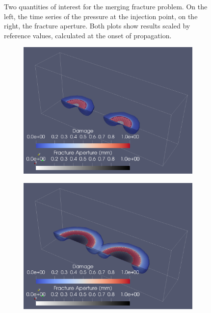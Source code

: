 \begin{figure}[h]
\noindent
\hspace{0.5cm}

\caption{Two quantities of interest for the merging fracture problem. On the left, the time series of the pressure at the injection point, on the right, the fracture aperture. Both plots show results scaled by reference values, calculated at the onset of propagation.}  
\label{fig:merging_charts}
\end{figure}


\begin{figure}[h]
\begin{subfigure}{.45\textwidth}
  \centering
  \includegraphics[width=\linewidth]{Chapter4/figures/merging/merging_t_1.png}
  \caption{}
  \label{fig:merge_t_0}
\end{subfigure}%
\hspace{1cm}
\begin{subfigure}{.45\textwidth}
  \centering
  \includegraphics[width=\linewidth]{Chapter4/figures/merging/merging_t_14.png}
  \caption{}
  \label{fig:merge_t_1}
\end{subfigure}%


\end{figure}
